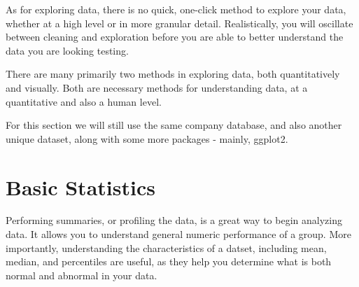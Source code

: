 \documentclass[
]{book}
\newenvironment{Shaded}{\begin{snugshade}}{\end{snugshade}}
\newcommand{\CommentTok}[1]{\textcolor[rgb]{0.56,0.35,0.01}{\textit{#1}}}
\newcommand{\DataTypeTok}[1]{\textcolor[rgb]{0.13,0.29,0.53}{#1}}
\newcommand{\KeywordTok}[1]{\textcolor[rgb]{0.13,0.29,0.53}{\textbf{#1}}}
\newcommand{\NormalTok}[1]{#1}
\newcommand{\OperatorTok}[1]{\textcolor[rgb]{0.81,0.36,0.00}{\textbf{#1}}}
\newcommand{\OtherTok}[1]{\textcolor[rgb]{0.56,0.35,0.01}{#1}}
\newcommand{\StringTok}[1]{\textcolor[rgb]{0.31,0.60,0.02}{#1}}
\begin{document}
As for exploring data, there is no quick, one-click method to explore your data, whether at a high level or in more granular detail. Realistically, you will oscillate between cleaning and exploration before you are able to better understand the data you are looking testing.

There are many primarily two methods in exploring data, both quantitatively and visually. Both are necessary methods for understanding data, at a quantitative and also a human level.

For this section we will still use the same company database, and also another unique dataset, along with some more packages - mainly, ggplot2.

\begin{Shaded}
\end{Shaded}

\hypertarget{explore-stats}{%
\section{Basic Statistics}\label{explore-stats}}

Performing summaries, or profiling the data, is a great way to begin analyzing data. It allows you to understand general numeric performance of a group. More importantly, understanding the characteristics of a datset, including mean, median, and percentiles are useful, as they help you determine what is both normal and abnormal in your data.
\end{document}
